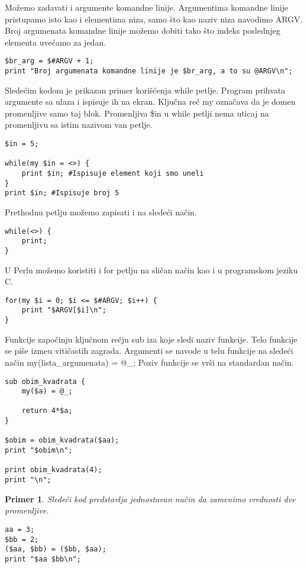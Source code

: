 \documentclass[a4paper]{article}
\newtheorem{primer}{Primer}[section]
\begin{document}
Mo\v zemo zadavati i argumente komandne linije. Argumentima komandne linije pristupamo isto kao i elementima niza, samo \v sto kao naziv niza navodimo ARGV. Broj argumenata komandne linije mo\v zemo dobiti tako \v sto indeks poslednjeg elementa uve\'camo za jedan.
\begin{lstlisting}[caption={Argumenti komandne linije}, frame=single, label=argv]
$br_arg = $#ARGV + 1;
print "Broj argumenata komandne linije je $br_arg, a to su @ARGV\n";
\end{lstlisting}
Slede\'cim kodom je prikazan primer kori\v s\'cenja while petlje. Program prihvata argumente sa ulaza i ispisuje ih na ekran. Klju\v cna re\v c my ozna\v cava da je domen promenljive samo taj blok. Promenljiva \$in u while petlji nema uticaj na promenljivu sa istim nazivom van petlje.
\begin{lstlisting}[caption={Unos i ispis elemenata u while petlji}, frame=single, label=while]
$in = 5;

while(my $in = <>) {
    print $in; #Ispisuje element koji smo uneli
}
print $in; #Ispisuje broj 5
\end{lstlisting}
Prethodnu petlju mo\v zemo zapisati i na slede\'ci na\v cin.
\begin{lstlisting}[caption={Unos i ispis elemenata u while petlji}, frame=single, label=while1]
while(<>) {
    print;
}
\end{lstlisting}
U Perlu mo\v zemo koristiti i for petlju na sli\v can na\v cin kao i u programskom jeziku C.
\begin{lstlisting}[caption={For petlja}, frame=single, label=for]
for(my $i = 0; $i <= $#ARGV; $i++) {
    print "$ARGV[$i]\n";
}
\end{lstlisting}
Funkcije zapo\v cinju klju\v cnom re\v cju sub iza koje sledi naziv funkcije. Telo funkcije se pi\v se izme\dj{}u viti\v castih zagrada. Argumenti se navode u telu funkcije na slede\'ci na\v cin my(lista\_argumenata) = @\_; Poziv funkcije se vr\v si na standardan na\v cin.
\begin{lstlisting}[caption={Funkcija koja ra\v cuna obim kvadrata}, frame=single, label=funkcija]
sub obim_kvadrata {
    my($a) = @_;
    
    return 4*$a;
}

$obim = obim_kvadrata($aa);
print "$obim\n"; 

print obim_kvadrata(4);
print "\n";
\end{lstlisting}

\begin{primer}
Slede\'ci kod predstavlja jednostavan na\v cin da zamenimo vrednosti dve promenljive.
\begin{lstlisting}[caption={Zamena vrednosti dve promenljive}, frame=single, label=zamena]
aa = 3;
$bb = 2;
($aa, $bb) = ($bb, $aa);
print "$aa $bb\n";

\end{lstlisting}

\end{primer}
\end{document}
